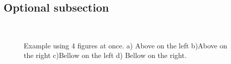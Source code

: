 \documentclass[twoside,letterpaper,twocolumn]{article}
\begin{document}
\subsection{Optional subsection}

\lipsum[10]

\begin{figure}[h!]
	\centering
	\\
	\caption{ Example using 4 figures at once. a) Above on the left b)Above on the right  c)Bellow on the left d) Bellow on the right.}
	\label{fig:label9}
\end{figure}

\lipsum[15]
\end{document}
